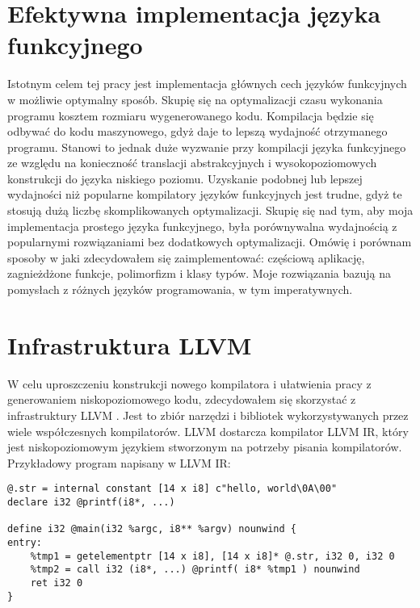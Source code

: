 \documentclass[declaration,shortabstract]{iithesis}
\begin{document}

\section{Efektywna implementacja języka funkcyjnego}

Istotnym celem tej pracy jest implementacja głównych cech języków funkcyjnych w
możliwie optymalny sposób. Skupię się na optymalizacji czasu wykonania 
programu kosztem rozmiaru wygenerowanego kodu. Kompilacja będzie się odbywać 
do kodu maszynowego, gdyż daje to lepszą wydajność otrzymanego programu. 
Stanowi to jednak duże wyzwanie przy kompilacji języka funkcyjnego ze względu 
na konieczność translacji abstrakcyjnych i wysokopoziomowych konstrukcji do 
języka niskiego poziomu. Uzyskanie 
podobnej lub lepszej wydajności niż popularne kompilatory języków funkcyjnych
jest trudne,
gdyż te stosują dużą liczbę skomplikowanych optymalizacji. Skupię się nad tym, 
aby moja implementacja prostego języka funkcyjnego, była porównywalna 
wydajnością 
z popularnymi rozwiązaniami bez dodatkowych optymalizacji. Omówię i porównam 
sposoby w jaki zdecydowałem się 
zaimplementować:
częściową aplikację, zagnieżdżone funkcje, polimorfizm i klasy typów. Moje 
rozwiązania bazują na pomysłach z różnych języków programowania, w tym 
imperatywnych. 

\section{Infrastruktura LLVM}




W celu uproszczeniu konstrukcji nowego kompilatora i ułatwienia pracy z 
generowaniem niskopoziomowego kodu, 
zdecydowałem się skorzystać z infrastruktury LLVM \cite{llvm}. 
Jest to zbiór narzędzi i bibliotek wykorzystywanych przez wiele współczesnych 
kompilatorów. LLVM dostarcza kompilator LLVM IR, który jest niskopoziomowym 
językiem stworzonym na potrzeby pisania 
kompilatorów. Przykładowy program napisany w LLVM IR:

\renewcommand{\thelstlisting}{\thesection\arabic{lstlisting}}
\begin{lstlisting}[frame=lines]
@.str = internal constant [14 x i8] c"hello, world\0A\00"
declare i32 @printf(i8*, ...)

define i32 @main(i32 %argc, i8** %argv) nounwind {
entry:
    %tmp1 = getelementptr [14 x i8], [14 x i8]* @.str, i32 0, i32 0
    %tmp2 = call i32 (i8*, ...) @printf( i8* %tmp1 ) nounwind
    ret i32 0
}
\end{lstlisting}
\end{document}
